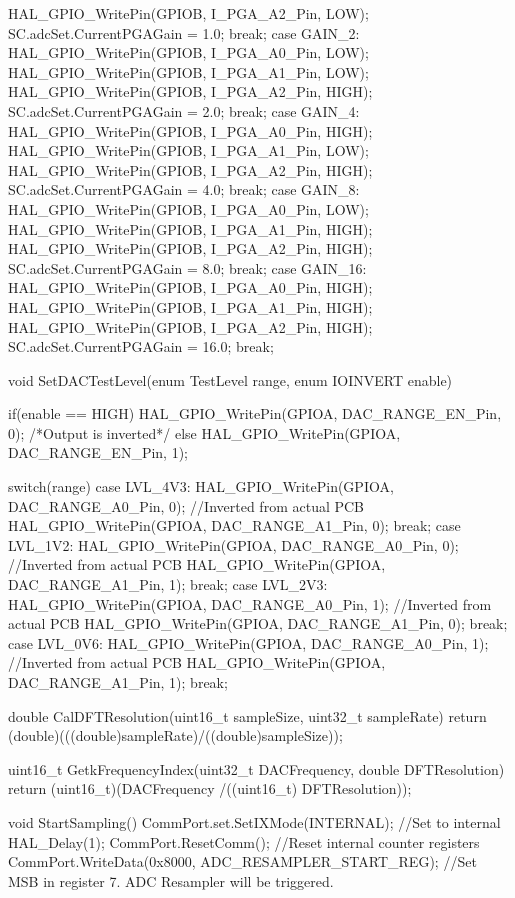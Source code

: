 {{{			  HAL_GPIO_WritePin(GPIOB, I_PGA_A2_Pin, LOW);
			  SC.adcSet.CurrentPGAGain = 1.0;
		break;
		case GAIN_2:
			  HAL_GPIO_WritePin(GPIOB, I_PGA_A0_Pin, LOW);
			  HAL_GPIO_WritePin(GPIOB, I_PGA_A1_Pin, LOW);
			  HAL_GPIO_WritePin(GPIOB, I_PGA_A2_Pin, HIGH);
			  SC.adcSet.CurrentPGAGain = 2.0;
		break;
		case GAIN_4:
			  HAL_GPIO_WritePin(GPIOB, I_PGA_A0_Pin, HIGH);
			  HAL_GPIO_WritePin(GPIOB, I_PGA_A1_Pin, LOW);
			  HAL_GPIO_WritePin(GPIOB, I_PGA_A2_Pin, HIGH);
			  SC.adcSet.CurrentPGAGain = 4.0;
		break;
		case GAIN_8:
			  HAL_GPIO_WritePin(GPIOB, I_PGA_A0_Pin, LOW);
			  HAL_GPIO_WritePin(GPIOB, I_PGA_A1_Pin, HIGH);
			  HAL_GPIO_WritePin(GPIOB, I_PGA_A2_Pin, HIGH);
			  SC.adcSet.CurrentPGAGain = 8.0;
		break;
		case GAIN_16:
			  HAL_GPIO_WritePin(GPIOB, I_PGA_A0_Pin, HIGH);
			  HAL_GPIO_WritePin(GPIOB, I_PGA_A1_Pin, HIGH);
			  HAL_GPIO_WritePin(GPIOB, I_PGA_A2_Pin, HIGH);
			  SC.adcSet.CurrentPGAGain = 16.0;
		break;
		}
	}
}

void SetDACTestLevel(enum TestLevel range, enum IOINVERT enable){
	if(enable == HIGH){
		HAL_GPIO_WritePin(GPIOA, DAC_RANGE_EN_Pin, 0); /*Output is inverted*/
	}else{
		HAL_GPIO_WritePin(GPIOA, DAC_RANGE_EN_Pin, 1);
	}

	switch(range){
	case LVL_4V3:
		 HAL_GPIO_WritePin(GPIOA, DAC_RANGE_A0_Pin, 0); //Inverted from actual PCB
		 HAL_GPIO_WritePin(GPIOA, DAC_RANGE_A1_Pin, 0);
	break;
	case LVL_1V2:
		 HAL_GPIO_WritePin(GPIOA, DAC_RANGE_A0_Pin, 0); //Inverted from actual PCB
		 HAL_GPIO_WritePin(GPIOA, DAC_RANGE_A1_Pin, 1);
	break;
	case LVL_2V3:
		 HAL_GPIO_WritePin(GPIOA, DAC_RANGE_A0_Pin, 1); //Inverted from actual PCB
		 HAL_GPIO_WritePin(GPIOA, DAC_RANGE_A1_Pin, 0);
	break;
	case LVL_0V6:
		 HAL_GPIO_WritePin(GPIOA, DAC_RANGE_A0_Pin, 1); //Inverted from actual PCB
		 HAL_GPIO_WritePin(GPIOA, DAC_RANGE_A1_Pin, 1);
	break;
	}
}

double CalDFTResolution(uint16_t sampleSize, uint32_t sampleRate){
	return (double)(((double)sampleRate)/((double)sampleSize));
}

uint16_t GetkFrequencyIndex(uint32_t DACFrequency, double DFTResolution){
	return  (uint16_t)(DACFrequency /((uint16_t) DFTResolution));
}

void StartSampling(){
	CommPort.set.SetIXMode(INTERNAL); //Set to internal
	HAL_Delay(1);
	CommPort.ResetComm(); //Reset internal counter registers
	CommPort.WriteData(0x8000, ADC_RESAMPLER_START_REG); //Set MSB in register 7. ADC Resampler will be triggered.
}

